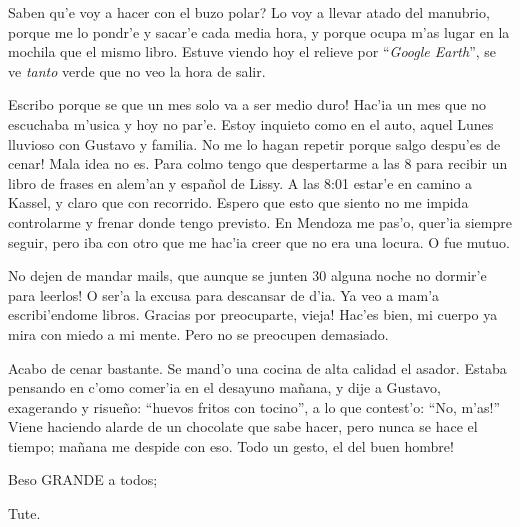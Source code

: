 \textquestiondown Saben qu'e voy a hacer con el buzo polar? Lo voy a llevar
atado del manubrio, porque me lo pondr'e y sacar'e cada media hora, y porque
ocupa m'as lugar en la mochila que el mismo libro. Estuve viendo hoy el relieve
por ``\emph{Google Earth}'', se ve \emph{tanto} verde que no veo la hora de
salir.

\textexclamdown Escribo porque se que un mes solo va a ser medio duro! Hac'ia
un mes que no escuchaba m'usica y hoy no par'e. Estoy inquieto como en el auto,
aquel Lunes lluvioso con Gustavo y familia. \textexclamdown No me lo hagan
repetir porque salgo despu'es de cenar! Mala idea no es. Para colmo tengo que
despertarme a las 8 para recibir un libro de frases en alem'an y espa\~nol de
Lissy. A las 8:01 estar'e en camino a Kassel, y claro que con recorrido. Espero
que esto que siento no me impida controlarme y frenar donde tengo previsto. En
Mendoza me pas'o, quer'ia siempre seguir, pero iba con otro que me hac'ia creer
que no era una locura. O fue mutuo.

\textexclamdown No dejen de mandar mails, que aunque se junten 30 alguna noche
no dormir'e para leerlos! O ser'a la excusa para descansar de d'ia. Ya veo a
mam'a escribi'endome libros. \textexclamdown Gracias por preocuparte, vieja!
Hac'es bien, mi cuerpo ya mira con miedo a mi mente. Pero no se preocupen
demasiado.

Acabo de cenar bastante. Se mand'o una cocina de alta calidad el asador. Estaba
pensando en c'omo comer'ia en el desayuno ma\~nana, y dije a Gustavo, exagerando
y risue\~no: ``huevos fritos con tocino'', a lo que contest'o: ``No,
\textexclamdown m'as!'' Viene haciendo alarde de un chocolate que sabe hacer,
pero nunca se hace el tiempo; ma\~nana me despide con eso. \textexclamdown Todo
un gesto, el del buen hombre!

Beso {\small GRANDE} a todos;

Tute.
